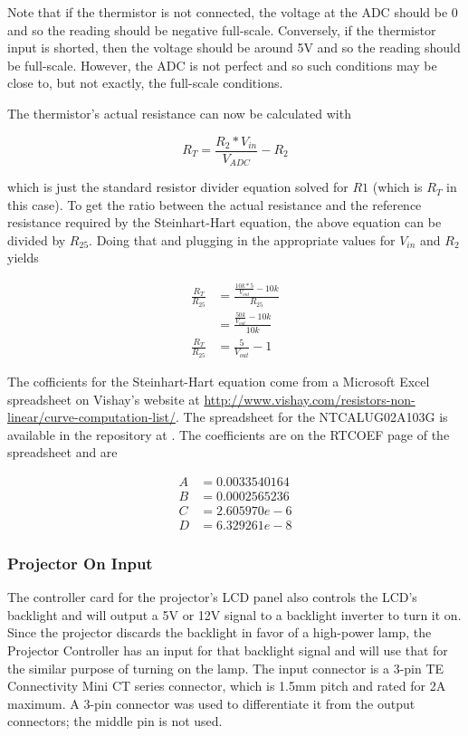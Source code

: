 \documentclass{article}
\begin{document}
Note that if the thermistor is not connected, the voltage at the ADC should be 0 and so the reading
should be negative full-scale.  Conversely, if the thermistor input is shorted, then the voltage
should be around 5V and so the reading should be full-scale.  However, the ADC is not perfect and so
such conditions may be close to, but not exactly, the full-scale conditions.

The thermistor's actual resistance can now be calculated with

\[
R_T = \frac{R_2*V_{in}}{V_{ADC}} - R_2
\]

which is just the standard resistor divider equation solved for $R1$ (which is $R_T$ in this case).
To get the ratio between the actual resistance and the reference resistance required by the 
Steinhart-Hart equation, the above equation can be divided by $R_{25}$.  Doing that and plugging in
the appropriate values for $V_{in}$ and $R_2$ yields

\begin{align*}
    \frac{R_T}{R_{25}} &= \frac{\frac{10k * 5}{V_{out}} - 10k}{R_{25}} \\
    &= \frac{\frac{50k}{V_{out}} - 10k}{10k} \\
    \frac{R_T}{R_{25}} &= \frac{5}{V_{out}} - 1
\end{align*}

The cofficients for the Steinhart-Hart equation come from a Microsoft Excel spreadsheet on Vishay's
website at \url{http://www.vishay.com/resistors-non-linear/curve-computation-list/}.  The
spreadsheet for the NTCALUG02A103G is available in the repository at
.  The coefficients are on the RTCOEF page of the
spreadsheet and are

\begin{align*}
    A &= 0.0033540164 \\
    B &= 0.0002565236 \\
    C &= 2.605970e-6 \\
    D &= 6.329261e-8
\end{align*}

\subsubsection{Projector On Input} \label{sssec:PJOnInput}
The controller card for the projector's LCD panel also controls the LCD's backlight and will output
a 5V or 12V signal to a backlight inverter to turn it on.  Since the projector discards the
backlight in favor of a high-power lamp, the Projector Controller has an input for that backlight
signal and will use that for the similar purpose of turning on the lamp.  The input connector is a
3-pin TE Connectivity Mini CT series connector, which is 1.5mm pitch and rated for 2A maximum.  A
3-pin connector was used to differentiate it from the output connectors; the middle pin is not used.
\end{document}
